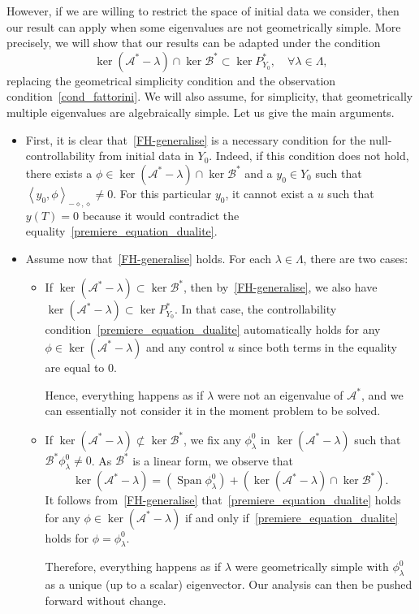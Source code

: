 \documentclass[AHL,Unicode,longabstracts]{cedram}
\newcommand\As{\mathcal{A}^*}
\newcommand\Bs{\mathcal{B}^*}
\newcommand{\Fzp}{Y_0}
\newcommand{\dual}[2]{\left\langle #1, #2 \right\rangle_{-\diamond,\diamond}}
\newcommand{\PFa}{P_{\Fzp}^*}
\DeclareMathOperator{\Span}{Span}
\let\oldforall\forall
\renewcommand*{\forall}{\mathrel{\oldforall}}
\begin{document}
However, if we are willing to restrict the space of initial data we consider, then our result can apply when some eigenvalues are not geometrically simple. More precisely, we will show that our results can be adapted under the condition
\begin{equation}\label{FH-generalise}
\ker(\As-\lambda) \cap \ker \Bs \subset \ker \PFa, \quad \forall \lambda \in \Lambda,
\end{equation}
replacing the geometrical simplicity condition and the observation condition~\eqref{cond_fattorini}. We will also assume, for simplicity, that geometrically multiple eigenvalues are algebraically simple. Let us give the main arguments.
\begin{itemize}
\item First, it is clear that~\eqref{FH-generalise} is a necessary condition for the null-controllability from initial data in $\Fzp$. Indeed, if this condition does not hold, there exists a $\phi\in \ker(\As-\lambda) \cap \ker \Bs$ and a $y_0\in \Fzp$ such that $\dual{y_0}{\phi}\neq 0$. For this particular $y_0$, it cannot exist a $u$ such that $y(T)=0$ because it would contradict the equality~\eqref{premiere_equation_dualite}.
\item Assume now that~\eqref{FH-generalise} holds. For each $\lambda\in \Lambda$, there are two cases:
\begin{itemize}
\item If $\ker(\As-\lambda)\subset \ker \Bs$, then by~\eqref{FH-generalise}, we also have $\ker(\As-\lambda)\subset \ker \PFa$. In that case, the controllability condition~\eqref{premiere_equation_dualite} automatically holds for any $\phi\in \ker(\As-\lambda)$ and any control $u$ since both terms in the equality are equal to $0$.

Hence, everything happens as if $\lambda$ were not an eigenvalue of $\As$, and we can essentially not consider it in the moment problem to be solved.
\item If $\ker(\As-\lambda)\not\subset \ker \Bs$, we fix any $\phi_\lambda^0$ in $\ker(\As-\lambda)$ such that $\Bs \phi_\lambda^0\neq 0$. As $\Bs$ is a linear form, we observe that
\[
\ker(\As-\lambda) = \left(\Span \phi_\lambda^0\right) + \left(\ker(\As-\lambda)\cap \ker \Bs\right).
\]
It follows from~\eqref{FH-generalise} that~\eqref{premiere_equation_dualite} holds for any $\phi\in \ker(\As-\lambda)$ if and only if~\eqref{premiere_equation_dualite} holds for $\phi=\phi_\lambda^0$.

Therefore, everything happens as if $\lambda$ were geometrically simple with $\phi_\lambda^0$ as a unique (up to a scalar) eigenvector. Our analysis can then be pushed forward without change.
\end{itemize}
\end{itemize}
\end{document}
